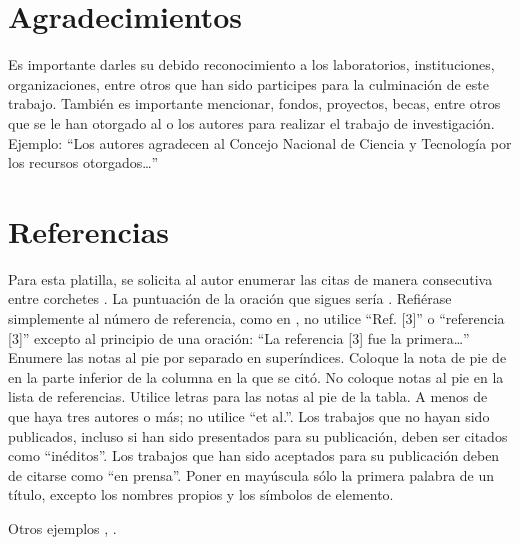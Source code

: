     \section{Agradecimientos}
    
    Es importante darles su debido reconocimiento a los laboratorios, instituciones, organizaciones, entre otros que han sido participes para la culminación de este trabajo. También es importante mencionar, fondos, proyectos, becas, entre otros que se le han otorgado al o los autores para realizar el trabajo de investigación. Ejemplo: “Los autores agradecen al Concejo Nacional de Ciencia y Tecnología por los recursos otorgados…”
    
    \section*{Referencias}
    
    Para esta platilla, se solicita al autor enumerar las citas de manera consecutiva entre corchetes \cite{YLi2013}. 
    La puntuación de la oración que sigues sería \cite{Mesaelides2011}. 
    Refiérase simplemente al número de referencia, como en \cite{Morales2012}, no utilice “Ref. [3]” o “referencia [3]” excepto al principio de una oración: “La referencia [3] fue la primera…”
    Enumere las notas al pie por separado en superíndices. Coloque la nota de pie de en la parte inferior de la columna en la que se citó. No coloque notas al pie en la lista de referencias. Utilice letras para las notas al pie de la tabla.
    A menos de que haya tres autores o más; no utilice “et al.”. Los trabajos que no hayan sido publicados, incluso si han sido presentados para su publicación, deben ser citados como “inéditos”. Los trabajos que han sido aceptados para su publicación deben de citarse como “en prensa”. Poner en mayúscula sólo la primera palabra de un título, excepto los nombres propios y los símbolos de elemento. 
    
    Otros ejemplos \cite{LAAngeles2021}, \cite{LAAngelesConni}. 
    
    
    
